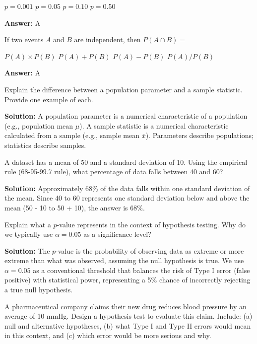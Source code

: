 \documentclass[11pt,letterpaper]{exam}
\begin{document}
\begin{questions}
\begin{choices}
  \correctchoice $p = 0.001$
  \choice $p = 0.05$
  \choice $p = 0.10$
  \choice $p = 0.50$
\end{choices}

\textbf{Answer:} A


\question[8] If two events $A$ and $B$ are independent, then $P(A \cap B) = $

\begin{choices}
  \correctchoice $P(A) \times P(B)$
  \choice $P(A) + P(B)$
  \choice $P(A) - P(B)$
  \choice $P(A) / P(B)$
\end{choices}

\textbf{Answer:} A


\question[12] Explain the difference between a population parameter and a sample statistic. Provide one example of each.

\textbf{Solution:} A population parameter is a numerical characteristic of a population (e.g., population mean $\mu$). A sample statistic is a numerical characteristic calculated from a sample (e.g., sample mean $\bar{x}$). Parameters describe populations; statistics describe samples.


\question[12] A dataset has a mean of 50 and a standard deviation of 10. Using the empirical rule (68-95-99.7 rule), what percentage of data falls between 40 and 60?

\textbf{Solution:} Approximately 68\% of the data falls within one standard deviation of the mean. Since 40 to 60 represents one standard deviation below and above the mean (50 - 10 to 50 + 10), the answer is 68\%.


\question[15] Explain what a $p$-value represents in the context of hypothesis testing. Why do we typically use $\alpha = 0.05$ as a significance level?

\textbf{Solution:} The $p$-value is the probability of observing data as extreme or more extreme than what was observed, assuming the null hypothesis is true. We use $\alpha = 0.05$ as a conventional threshold that balances the risk of Type I error (false positive) with statistical power, representing a 5\% chance of incorrectly rejecting a true null hypothesis.


\question[22] A pharmaceutical company claims their new drug reduces blood pressure by an average of 10 mmHg. Design a hypothesis test to evaluate this claim. Include: (a) null and alternative hypotheses, (b) what Type I and Type II errors would mean in this context, and (c) which error would be more serious and why.


\end{questions}
\end{document}
